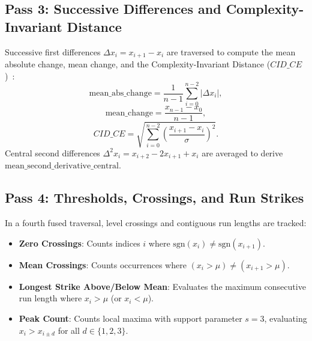 \documentclass[conference]{IEEEtran}
\begin{document}
\subsection{Pass 3: Successive Differences and Complexity-Invariant Distance}
Successive first differences $\Delta x_i = x_{i+1} - x_i$ are traversed to compute the mean absolute change, mean change, and the Complexity-Invariant Distance ($CID\_CE$)~\cite{batista2014cid}:
\begin{equation}
\label{eq:mean_abs_change}
\text{mean\_abs\_change} = \frac{1}{n-1} \sum_{i=0}^{n-2} |\Delta x_i|,
\end{equation}
\begin{equation}
\label{eq:mean_change}
\text{mean\_change} = \frac{x_{n-1} - x_0}{n-1},
\end{equation}
\begin{equation}
\label{eq:cid_ce}
CID\_CE = \sqrt{\sum_{i=0}^{n-2} \left(\frac{x_{i+1} - x_i}{\sigma}\right)^2}.
\end{equation}
Central second differences $\Delta^2 x_i = x_{i+2} - 2x_{i+1} + x_i$ are averaged to derive $\text{mean\_second\_derivative\_central}$.

\subsection{Pass 4: Thresholds, Crossings, and Run Strikes}
In a fourth fused traversal, level crossings and contiguous run lengths are tracked:
\begin{itemize}
    \item \textbf{Zero Crossings}: Counts indices $i$ where $\text{sgn}(x_i) \neq \text{sgn}(x_{i+1})$.
    \item \textbf{Mean Crossings}: Counts occurrences where $(x_i > \mu) \neq (x_{i+1} > \mu)$.
    \item \textbf{Longest Strike Above/Below Mean}: Evaluates the maximum consecutive run length where $x_i > \mu$ (or $x_i < \mu$).
    \item \textbf{Peak Count}: Counts local maxima with support parameter $s=3$, evaluating $x_i > x_{i \pm d}$ for all $d \in \{1, 2, 3\}$.
\end{itemize}
\end{document}
